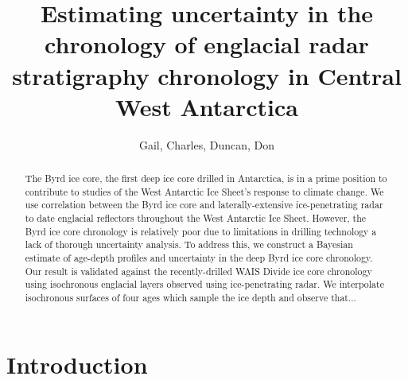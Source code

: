 \documentclass[letterpaper]{igs}
\begin{document}
\title{Estimating uncertainty in the chronology of englacial radar stratigraphy chronology in Central West Antarctica}
\author{Gail, Charles, Duncan, Don}
\maketitle

\begin{abstract}

The Byrd ice core, the first deep ice core drilled in Antarctica, is in a prime position to contribute to studies of the West Antarctic Ice Sheet's response to climate change. We use correlation between the Byrd ice core and laterally-extensive ice-penetrating radar to date englacial reflectors throughout the West Antarctic Ice Sheet. However, the Byrd ice core chronology is relatively poor due to limitations in drilling technology a lack of thorough uncertainty analysis. To address this, we construct a Bayesian estimate of age-depth profiles and uncertainty in the deep Byrd ice core chronology. Our result is validated against the recently-drilled WAIS Divide ice core chronology using isochronous englacial layers observed using ice-penetrating radar. We interpolate isochronous surfaces of four ages which sample the ice depth and observe that...

\end{abstract}
%

\section{Introduction}\label{intro}
	
	
\end{document}
